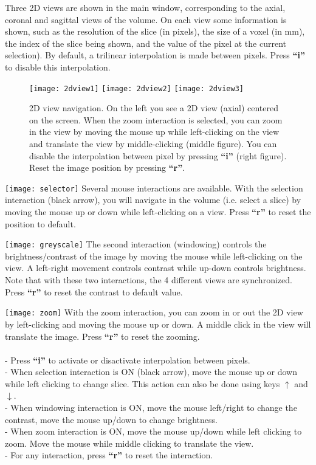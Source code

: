 Three 2D views are shown in the main window, corresponding to the axial, coronal
and sagittal views of the volume. On each view some information is
shown, such as the resolution of the slice (in pixels), the size of a voxel (in mm), the
index of the slice being shown, and the value of the pixel at the current selection). 
By default, a trilinear interpolation is made between pixels. Press
{\large \bf ``i''} to disable this interpolation.

\begin{figure}[htbp]
    \texttt{[image: 2dview1]}
    \texttt{[image: 2dview2]}
    \texttt{[image: 2dview3]}
  \caption{2D view navigation. On the left you see a 2D view (axial) centered on the
    screen. When the zoom interaction is selected, you can zoom in the view by moving
    the mouse up while left-clicking on the view and translate the view by
    middle-clicking (middle figure). You can disable the interpolation between pixel by
    pressing {\large \bf``i''} (right figure). Reset the image position by pressing
    {\large \bf``r''}.
  \label{fig:2dviewzoom}}
\end{figure}

\noindent \texttt{[image: selector]}
Several mouse interactions are available. With the selection interaction (black arrow),
you will navigate in the volume (i.e. select a slice) by moving the mouse up or down
while left-clicking on a view. Press {\large \bf``r''} to reset the position to default.

\noindent \texttt{[image: greyscale]}
The second interaction (windowing) controls the brightness/contrast of the image by moving the
mouse while left-clicking on the view. A left-right movement controls contrast while up-down
controls brightness. Note that with these two interactions, the 4 different views are
synchronized. Press {\large \bf``r''} to reset the contrast to default value.

\noindent \texttt{[image: zoom]}
With the zoom interaction, you can zoom in or out the 2D view by left-clicking and moving the
mouse up or down. A middle click in the view will translate the image. Press {\large
  \bf``r''} to reset the zooming. 
\ \\

\ \\

\noindent - Press {\large \bf ``i''} to activate or disactivate interpolation between
pixels.\\
- When selection interaction is ON (black arrow), move the mouse up or down while left
clicking to change slice. This action can also be done using keys $\uparrow$ and
$\downarrow$. \\
- When windowing interaction is ON, move the mouse left/right to change the contrast, move
the mouse up/down to change brightness.\\
- When zoom interaction is ON, move the mouse up/down while left clicking to zoom. Move the
mouse while middle clicking to translate the view. \\
- For any interaction, press {\large \bf ``r''} to reset the interaction. 

